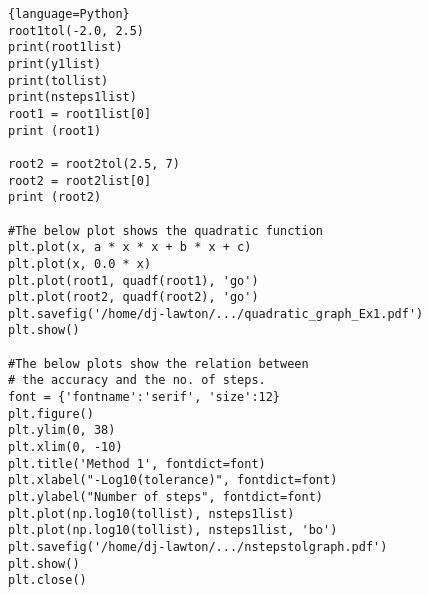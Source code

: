 \documentclass{article}
\begin{document}
\begin{lstlisting}{language=Python}
root1tol(-2.0, 2.5)
print(root1list)
print(y1list)
print(tollist)
print(nsteps1list)
root1 = root1list[0]
print (root1)

root2 = root2tol(2.5, 7)
root2 = root2list[0]
print (root2)

#The below plot shows the quadratic function
plt.plot(x, a * x * x + b * x + c)
plt.plot(x, 0.0 * x)
plt.plot(root1, quadf(root1), 'go')
plt.plot(root2, quadf(root2), 'go')
plt.savefig('/home/dj-lawton/.../quadratic_graph_Ex1.pdf')
plt.show()

#The below plots show the relation between
# the accuracy and the no. of steps.
font = {'fontname':'serif', 'size':12}
plt.figure()
plt.ylim(0, 38)
plt.xlim(0, -10)
plt.title('Method 1', fontdict=font)
plt.xlabel("-Log10(tolerance)", fontdict=font)
plt.ylabel("Number of steps", fontdict=font)
plt.plot(np.log10(tollist), nsteps1list)
plt.plot(np.log10(tollist), nsteps1list, 'bo')
plt.savefig('/home/dj-lawton/.../nstepstolgraph.pdf')
plt.show()
plt.close()
\end{lstlisting}
\end{document}
